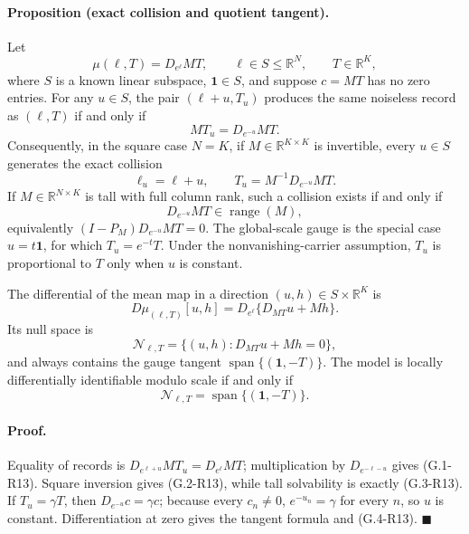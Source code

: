 
\paragraph{Proposition (exact collision and quotient tangent).}
Let
\[
 \mu(\ell,T)=D_{e^\ell}MT,
 \qquad \ell\in S\le\mathbb R^N,
 \qquad T\in\mathbb R^K,
\]
where $S$ is a known linear subspace, $\mathbf1\in S$, and suppose
$c=MT$ has no zero entries.  For
any $u\in S$, the pair $(\ell+u,T_u)$ produces the same noiseless
record as $(\ell,T)$ if and only if
\begin{equation}
 MT_u=D_{e^{-u}}MT. \tag{G.1-R13}
\end{equation}
Consequently, in the square case $N=K$, if
$M\in\mathbb R^{K\times K}$ is invertible, every
$u\in S$ generates the exact collision
\begin{equation}
 \ell_u=\ell+u,\qquad
 T_u=M^{-1}D_{e^{-u}}MT. \tag{G.2-R13}
\end{equation}
If $M\in\mathbb R^{N\times K}$ is tall with full column rank, such a
collision exists if and only if
\begin{equation}
 D_{e^{-u}}MT\in\operatorname{range}(M), \tag{G.3-R13}
\end{equation}
equivalently $(I-P_M)D_{e^{-u}}MT=0$.  The global-scale gauge is the
special case $u=t\mathbf1$, for which $T_u=e^{-t}T$.  Under the
nonvanishing-carrier assumption, $T_u$ is proportional to $T$ only
when $u$ is constant.

The differential of the mean map in a direction
$(u,h)\in S\times\mathbb R^K$ is
\[
 D\mu_{(\ell,T)}[u,h]
 =D_{e^\ell}\{D_{MT}u+Mh\}.
\]
Its null space is
\[
 \mathcal N_{\ell,T}
 =\{(u,h):D_{MT}u+Mh=0\},
\]
and always contains the gauge tangent
$\operatorname{span}\{(\mathbf1,-T)\}$.  The model is locally
differentially identifiable modulo scale if and only if
\begin{equation}
 \mathcal N_{\ell,T}
 =\operatorname{span}\{(\mathbf1,-T)\}. \tag{G.4-R13}
\end{equation}

\paragraph{Proof.}
Equality of records is
$D_{e^{\ell+u}}MT_u=D_{e^\ell}MT$; multiplication by
$D_{e^{-\ell-u}}$ gives (G.1-R13).  Square inversion gives
(G.2-R13), while tall solvability is exactly (G.3-R13).  If
$T_u=\gamma T$, then $D_{e^{-u}}c=\gamma c$; because every $c_n\ne0$,
$e^{-u_n}=\gamma$ for every $n$, so $u$ is constant.  Differentiation
at zero gives the tangent formula and (G.4-R13).
\hfill$\blacksquare$

